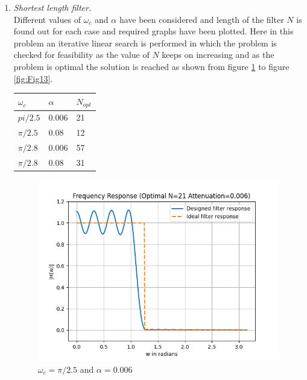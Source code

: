 \documentclass[conference]{IEEEtran}
\begin{document}
\begin{enumerate}[label=(\alph*)]
\item \textit{Shortest length filter.}\\
Different values of $\omega_c$ and $\alpha$ have been considered and length of the filter $N$ is found out for each case and required graphs have been plotted. Here in this problem an iterative linear search is performed in which the problem is checked for feasibility as the value of $N$ keeps on increasing and as the problem is optimal the solution is reached as shown from figure \ref{fig:Fig10} to figure \ref{fig:Fig13}.
\vspace{3mm}
\begin{center}
\begin{tabular}{ | m{3em} | m{1cm}| m{1cm} | } 
  \hline
  \textbf{$\omega_c$}& \textbf{$\alpha$} & \textbf{$N_{opt}$}\\ 
  \hline
  $pi/2.5$ & 0.006 & 21 \\ 
  \hline
  $\pi/2.5$ & 0.08 & 12 \\ 
  \hline
  $\pi/2.8$ & 0.006 & 57 \\ 
  \hline
  $\pi/2.8$ & 0.08 & 31\\ 
  \hline
\end{tabular}
\end{center}
\begin{figure}[!h]
	\begin{center} 
	    \includegraphics[width=0.7\columnwidth]{figs/C/w1_a1}
	\end{center}
\caption{$\omega_c=\pi/2.5$ and $\alpha = 0.006$}
\label{fig:Fig10}
\end{figure}


\end{enumerate}
\end{document}
